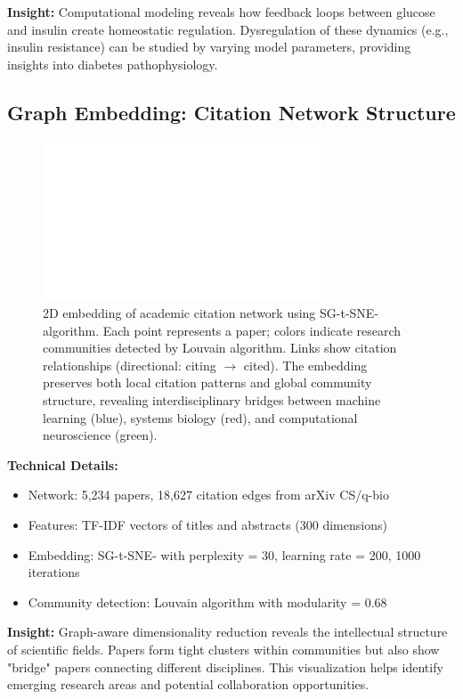 \textbf{Insight:} Computational modeling reveals how feedback loops between glucose and insulin create homeostatic regulation. Dysregulation of these dynamics (e.g., insulin resistance) can be studied by varying model parameters, providing insights into diabetes pathophysiology.

\vspace{2em}


\subsection*{Graph Embedding: Citation Network Structure}

\begin{figure}[h]
\centering
\includegraphics[width=0.75\textwidth]{assets/placeholder_1600x900.png}
\caption{2D embedding of academic citation network using SG-t-SNE-\textPi{} algorithm. Each point represents a paper; colors indicate research communities detected by Louvain algorithm. Links show citation relationships (directional: citing $\to$ cited). The embedding preserves both local citation patterns and global community structure, revealing interdisciplinary bridges between machine learning (blue), systems biology (red), and computational neuroscience (green).}
\end{figure}

\textbf{Technical Details:}
\begin{itemize}[leftmargin=1.2em, itemsep=0.1em]
  \item Network: 5,234 papers, 18,627 citation edges from arXiv CS/q-bio
  \item Features: TF-IDF vectors of titles and abstracts (300 dimensions)
  \item Embedding: SG-t-SNE-\textPi{} with perplexity = 30, learning rate = 200, 1000 iterations
  \item Community detection: Louvain algorithm with modularity = 0.68
\end{itemize}

\textbf{Insight:} Graph-aware dimensionality reduction reveals the intellectual structure of scientific fields. Papers form tight clusters within communities but also show "bridge" papers connecting different disciplines. This visualization helps identify emerging research areas and potential collaboration opportunities.

